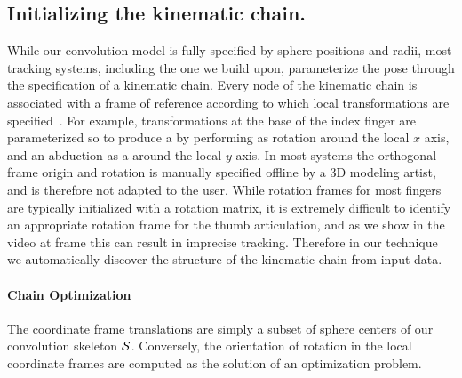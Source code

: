 \begin{DRAFT}
\subsection{Initializing the kinematic chain.}
While our convolution model is fully specified by sphere positions and radii, most tracking systems, including the one we build upon, parameterize the pose through the specification of a kinematic chain. Every node of the kinematic chain is associated with a frame of reference according to which local transformations are specified~\cite[Fig.2-(middle)]{tagliasacchi2015robust}. For example, transformations at the base of the index finger are parameterized so to produce a  by performing as rotation around the local $x$ axis, and an abduction as a  around the local $y$ axis. In most systems the orthogonal frame origin and rotation is manually specified offline by a 3D modeling artist, and is therefore not adapted to the user. 
% 
While rotation frames for most fingers are typically initialized with a rotation matrix, it is extremely difficult to identify an appropriate rotation frame for the thumb articulation, and as we show in the video at frame \todo{[00:00]} this can result in imprecise tracking. Therefore in our technique we automatically discover the structure of the kinematic chain from input data. 

\paragraph{Chain Optimization}
The coordinate frame translations are simply a subset of sphere centers of our convolution skeleton $\mathcal{S}$.  Conversely, the orientation of rotation in the local coordinate frames are computed as the solution of an optimization problem.
\end{DRAFT}
